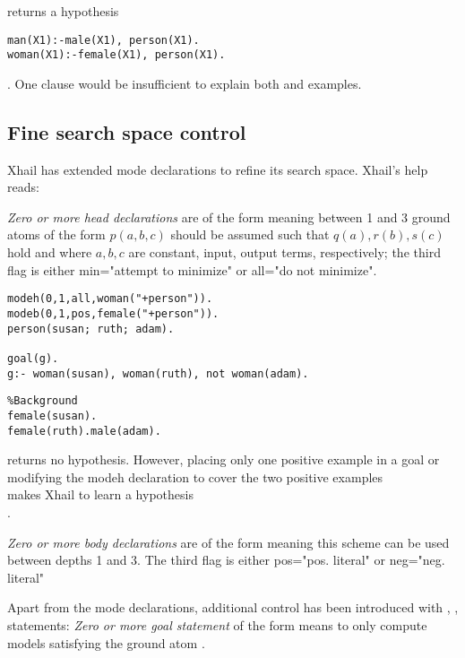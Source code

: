returns a hypothesis
\begin{lstlisting}
man(X1):-male(X1), person(X1).
woman(X1):-female(X1), person(X1).
\end{lstlisting}.
One clause would be insufficient to explain both  and  examples.

\subsection{Fine search space control}
Xhail has extended mode declarations to refine its search space. Xhail's help reads:

\emph{Zero or more head declarations} are of the form
 meaning between 1 and 3 ground atoms
 of the form $p(a,b,c)$ should be assumed such that $q(a), r(b), s(c)$ hold 
 and where $a, b, c$ are constant, input, output terms, respectively;
 the third flag is either min="attempt to minimize" or all="do not minimize".
 
\begin{minipage}[t]{.50\textwidth}
\begin{lstlisting}
modeh(0,1,all,woman("+person")).
modeb(0,1,pos,female("+person")).
person(susan; ruth; adam).

goal(g).
g:- woman(susan), woman(ruth), not woman(adam).
\end{lstlisting}
\end{minipage}
\begin{minipage}[t]{.20\textwidth}
\begin{lstlisting}
%Background
female(susan).
female(ruth).male(adam).
\end{lstlisting}
\end{minipage}

returns no hypothesis. However, placing only one positive example in a goal
 or modifying the modeh declaration to cover the two positive examples\\
 makes Xhail to learn a hypothesis\\
.

\emph{Zero or more body declarations} are of the form  meaning this scheme can be used between 
 depths 1 and 3.  The third flag is either pos="pos. literal" or neg="neg. literal" 

Apart from the mode declarations, additional control has been introduced with , ,  statements:
\emph{Zero or more goal statement} of the form  means to only compute models satisfying the ground atom .

